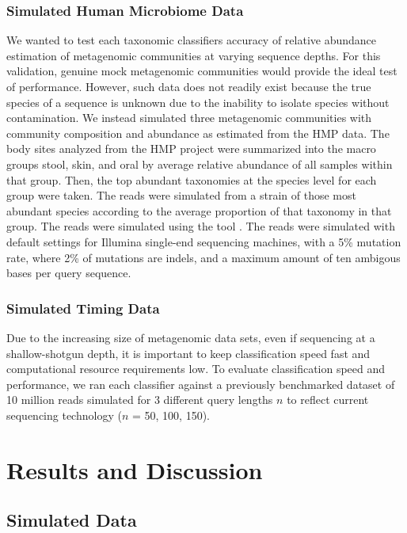 \subsubsection{Simulated Human Microbiome Data}

We wanted to test each taxonomic classifiers accuracy of relative abundance estimation of metagenomic communities at varying sequence depths. For this validation, genuine mock metagenomic communities would provide the ideal test of performance. However, such data does not readily exist because the true species of a sequence is unknown due to the inability to isolate species without contamination. We instead simulated three metagenomic communities with community composition and abundance as estimated from the HMP data. The body sites analyzed from the HMP project were summarized into the macro groups stool, skin, and oral by average relative abundance of all samples within that group. Then, the top abundant taxonomies at the species level for each group were taken. The reads were simulated from a strain of those most abundant species according to the average proportion of that taxonomy in that group. The reads were simulated using the tool . The reads were simulated with default settings for Illumina single-end sequencing machines, with a 5\% mutation rate, where 2\% of mutations are indels, and a maximum amount of ten ambigous bases per query sequence.

\subsubsection{Simulated Timing Data}

Due to the increasing size of metagenomic data sets, even if sequencing at a shallow-shotgun depth, it is important to keep classification speed fast and computational resource requirements low. To evaluate classification speed and performance, we ran each classifier against a previously benchmarked dataset of 10 million reads simulated for 3 different query lengths $n$ to reflect current sequencing technology ($n$ = 50, 100, 150).

\section{Results and Discussion}

\subsection{Simulated Data}

